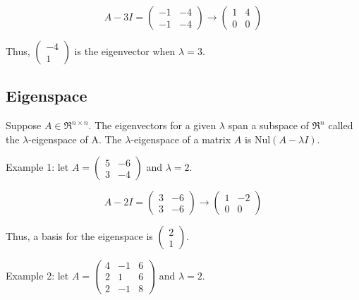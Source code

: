 \begin{equation}
    A - 3I = \begin{pmatrix}
        -1 & -4 \\ -1 & -4
    \end{pmatrix} \rightarrow \begin{pmatrix}
        1 & 4 \\ 0 & 0
    \end{pmatrix}
\end{equation}

\noindent
Thus, \(\begin{pmatrix}
    -4 \\ 1
\end{pmatrix}\) is the eigenvector when \(\lambda = 3\).

\subsection{Eigenspace}
\begin{definition}
    Suppose \(A \in \Re^{n\times n}\). The eigenvectors for a given \(\lambda\) span a subspace of \(\Re^n\) called the \(\lambda\)-eigenspace of A. The \(\lambda\)-eigenspace of a matrix \(A\) is \(\text{Nul}(A-\lambda I)\).
\end{definition}

\noindent
Example 1: let \(A= \begin{pmatrix}
    5 & -6 \\ 3 & -4
\end{pmatrix}\) and \(\lambda=2\).

\begin{equation}
    A - 2 I = \begin{pmatrix}
        3 & -6 \\ 3 & -6
    \end{pmatrix} \rightarrow \begin{pmatrix}
        1 & -2 \\ 0 & 0
    \end{pmatrix}
\end{equation}

\noindent
Thus, a basis for the eigenspace is \(\begin{pmatrix}
    2 \\ 1
\end{pmatrix}\).

\noindent
Example 2: let \(A= \begin{pmatrix}
    4 & -1 & 6 \\
    2 & 1 & 6 \\
    2 & -1 & 8
\end{pmatrix}\) and \(\lambda=2\).

